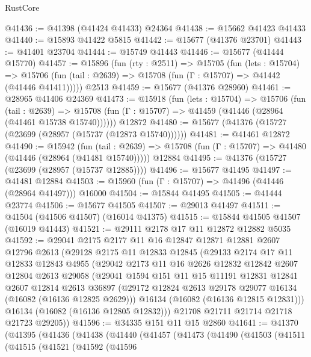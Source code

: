 \begin{lexlean}{RustCore}
\begin{coremodule}
@41436 := @41398 (@41424 @41433) @24364
@41438 := @15662 @41423 @41433
@41440 := @15893 @41422 @5815
@41442 := @15677 (@41376 @23701)
@41443 := @41401 @23704
@41444 := @15749 @41443
@41446 := @15677 (@41444 @15770)
@41457 := @15896
    (fun (rty : @2511) =>
    @15705
      (fun (lets : @15704) =>
      @15706 (fun (tail : @2639) => @15708 (fun (Γ : @15707) => @41442 (@41446 @41411)))))
    @2513
@41459 := @15677 (@41376 @28960)
@41461 := @28965 @41406 @24369
@41473 := @15918
    (fun (lets : @15704) =>
    @15706
      (fun (tail : @2639) =>
      @15708 (fun (Γ : @15707) => @41459 (@41446 (@28964 (@41461 @15738 @15740))))))
    @12872
@41480 := @15677 (@41376 (@15727 (@23699 (@28957 (@15737 (@12873 @15740))))))
@41481 := @41461 @12872
@41490 := @15942
    (fun (tail : @2639) => @15708 (fun (Γ : @15707) => @41480 (@41446 (@28964 (@41481 @15740)))))
    @12884
@41495 := @41376 (@15727 (@23699 (@28957 (@15737 @12885))))
@41496 := @15677 @41495
@41497 := @41481 @12884
@41503 := @15960 (fun (Γ : @15707) => @41496 (@41446 (@28964 @41497))) @16000
@41504 := @15844 @41495
@41505 := @41444 @23774
@41506 := @15677 @41505
@41507 := @29013 @41497
@41511 := @41504 (@41506 @41507) (@16014 @41375)
@41515 := @15844 @41505 @41507 (@16019 @41443)
@41521 := @29111 @2178 @17 @11 @12872 @12882 @5035
@41592 := @29041
    @2175
    @2177
    @11
    @16
    @12847
    @12871
    @12881
    @2607
    @12796
    @2613
    (@29128
      @2175
      @11
      @12833
      @12845
      (@29133
        @2174
        @17
        @11
        @12833
        @12843
        @4955
        (@29042
          @2173
          @11
          @16
          @2626
          @12832
          @12842
          @2607
          @12804
          @2613
          @29058
          (@29041
            @1594
            @151
            @11
            @15
            @11191
            @12831
            @12841
            @2607
            @12814
            @2613
            @36897
            (@29172 @12824 @2613 @29178 @29077 @16134 (@16082 (@16136 @12825 @2629)))
            @16134
            (@16082 (@16136 @12815 @12831)))
          @16134
          (@16082 (@16136 @12805 @12832)))
        @21708
        @21711
        @21714
        @21718
        @21723
        @29205))
@41596 := @34335 @151 @11 @15 @2860
@41641 := @41370
    (@41395
      (@41436
        (@41438
          (@41440
            (@41457
              (@41473
                (@41490
                  (@41503
                    (@41511
                      (@41515
                        (@41521
                          (@41592
                            (@41596

\end{coremodule}
\end{lexlean}
